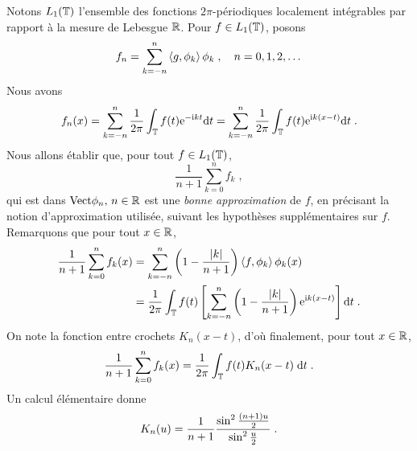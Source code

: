 Notons  $L_1(\mathbb{T})$ l'ensemble des fonctions $2\pi$-p\'{e}riodiques
localement int\'{e}grables par rapport \`{a} la mesure de Lebesgue $\mathbb{R}$. Pour $f \in
L_1(\mathbb{T})$, posons
\[
f_n= \sum_{k=-n}^n \left\langle g, \phi_k \right\rangle \phi_k \;, \quad n=0,1,2,\dots
\]
Nous avons
\[
f_n(x) = \sum_{k=-n}^n \frac{1}{2\pi} \int_{\mathbb{T}} f(t) \mathrm{e}^{-\mathrm{i} k t} \mathrm{d} t = \sum_{k=-n}^n \frac{1}{2 \pi} \int_{\mathbb{T}} f(t) \mathrm{e}^{\mathrm{i} k(x-t)} \mathrm{d} t \;.
\]
Nous allons \'{e}tablir que, pour tout $f \in L_1(\mathbb{T})$,
\[
\frac{1}{n+1} \sum_{k=0}^n f_k\;,
\]
qui est dans $\mathrm{Vect}{\phi_n,\,n\in\mathbb{R}}$ est une \emph{bonne approximation} de
$f$, en pr\'{e}cisant la notion d'approximation utilis\'{e}e, suivant les hypoth\`{e}ses
suppl\'{e}mentaires sur $f$. Remarquons que pour tout $x\in\mathbb{R}$,
\begin{align*}
\frac{1}{n+1} \sum_{k=0}^{n} f_k(x)&= \sum_{k=-n}^n \left( 1 - \frac{|k|}{n+1}\right) \left\langle f, \phi_k \right\rangle \phi_k(x) \\
&= \frac{1}{2 \pi} \int_{\mathbb{T}} f(t) \left[ \sum_{k=-n}^n \left( 1 - \frac{|k|}{n+1}\right) \mathrm{e}^{\mathrm{i} k (x-t)} \right] \mathrm{d} t \;.
\end{align*}
On note la fonction entre crochets $K_n(x-t)$, d'o\`{u} finalement, pour tout
$x\in\mathbb{R}$,
\begin{equation}
  \label{eq:convol_fejer}
  \frac{1}{n+1} \sum_{k=0}^{n} f_k(x) =
\frac{1}{2 \pi} \int_{\mathbb{T}} f(t) K_n(x-t)\;  \mathrm{d} t \;.
\end{equation}
Un calcul \'{e}l\'{e}mentaire donne
\begin{equation}
\label{eq:fejer}
K_n(u) %
= \frac{1}{n+1} \frac{\sin^2 \frac{(n+1)u}{2}}{\sin^2 \frac{u}{2}} \eqsp.
\end{equation}


